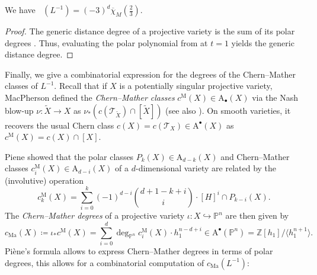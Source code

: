 \documentclass[12pt,a4paper,english]{scrartcl}
\newcommand{\ZZ}{\mathbb{Z}}
\newcommand{\PP}{\mathbb{P}}
\newcommand{\TT}{\mathbb{T}}
\DeclareMathOperator{\DD}{DD}
\DeclareMathOperator{\DDgen}{DD_{gen}}
\newcommand{\ChowGrp}{\mathrm{A}}
\begin{document}
\begin{theorem}
We have $\DDgen(L^{-1}) = (-3)^d \overline{\chi}_M(\frac{2}{3})$.
\end{theorem}
\begin{proof}
The generic distance degree of a projective variety is the sum of its polar degrees \cite[Theorem 5.4]{Draisma2015}. Thus, evaluating the polar polynomial from  at $t=1$ yields the generic distance degree.
\end{proof}

Finally, we give a combinatorial expression for the degrees of the Chern--Mather classes of $L^{-1}$. Recall that if $X$ is a potentially singular projective variety, MacPherson \cite{MacPherson1974} defined the \emph{Chern--Mather classes} $c^{\mathrm{M}}(X) \in \mathrm{A}_\bullet(X)$ via the Nash blow-up $\nu\colon \widetilde{X} \to X$ as $\nu_*(c({\mathcal T}_{\widetilde{X}}) \cap [\widetilde{X}])$ (see also \cite[Example 4.2.9]{Fulton1998}). On smooth varieties, it recovers the usual Chern class $c(X) = c(\mathcal{T}_X) \in \mathrm{A}^\bullet(X)$ as $c^{\mathrm{M}}(X) = c(X)\cap [X]$.

Piene \cite[Theorème 3]{Piene1988} showed that the polar classes $P_k(X) \in \mathrm{A}_{d-k}(X)$ and Chern--Mather classes $c^{\mathrm{M}}_i(X) \in \mathrm{A}_{d-i}(X)$ of a $d$-dimensional variety are related by the (involutive) operation
\[
c^{\mathrm{M}}_{k}(X) = \sum_{i=0}^k (-1)^{d-i}\binom{d+1-k+i}{i} \cdot [H]^i \cap P_{k-i}(X).
\]
The \emph{Chern--Mather degrees} of a projective variety $\iota \colon X \hookrightarrow \PP^n$ are then given by
\[
c_{\mathrm{Ma}}(X) \coloneq  \iota_*c^{\mathrm{M}}(X) = \sum_{i=0}^d \deg_{\PP^n} c^{\mathrm{M}}_{i}(X) \cdot h_1^{n-d+i} \in \ChowGrp^\bullet(\PP^n) = \ZZ[h_1]/\langle h_1^{n+1}\rangle.
\]
Piène's formula allows to express Chern--Mather degrees in terms of polar degrees, this allows for a combinatorial computation of $c_{\mathrm{Ma}}(L^{-1})$:
\end{document}
